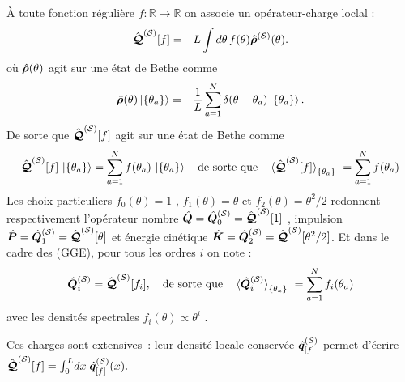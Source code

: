 
À toute fonction régulière
\(
  f:\mathbb R\!\to\!\mathbb R
\)
on associe un opérateur-charge loclal :
\begin{eqnarray}\label{chap.2.charge.f.1}
	\hat{\bm{\mathcal{Q}}}^{(\mathcal{S})}[f] & = &  L \int d\theta \, f(\theta) \hat{\bm{\rho}}^{(\mathcal{S})}(\theta).	
\end{eqnarray}
où $\hat{\bm{\rho}}(\theta)$ agit sur une état de Bethe comme 
\begin{eqnarray}\label{chap.2.rho.1}
	 \hat{\bm{\rho}}(\theta) \ket{ \{ \theta_a \} } &=& \frac{1}{L} \sum_{a = 1 }^N  \delta ( \theta - \theta_a ) \ket{ \{ \theta_a \} }.	
\end{eqnarray}
De sorte que $\hat{\bm{\mathcal{Q}}}^{(\mathcal{S})}[f]$ agit sur une état de Bethe comme
\begin{eqnarray}\label{chap.2.charge.1}
	\operator{\mathcal{Q}}^{(\mathcal{S})}[f]\,\ket{\{\theta_a\} } =  \sum_{a=1}^{N}f(\theta_a)\,\ket{\{\theta_a\} } \quad \mbox{de sorte que} \quad \braket{\operator{\mathcal{Q}}^{(\mathcal{S})}[f]}_{\{\theta_a\}} = \sum_{a=1}^N f(\theta_a)
\end{eqnarray}
Les choix particuliers
\(
  f_0(\theta)=1
\)
,
\(
  f_1(\theta)=\theta
\)
et
\(
  f_2(\theta)=\theta^{2}/2
\)
redonnent respectivement l'opérateur nombre \(\hat{\bm{Q}}=\hat{\bm{Q}}_0^{(\mathcal{S})} = \hat{\bm{\mathcal{Q}}}^{(\mathcal{S})}[1]\) , impulsion \(\hat{\bm{P}}=\hat{\bm{Q}}_1^{(\mathcal{S})} = \hat{\bm{\mathcal{Q}}}^{(\mathcal{S})}[\theta]\) et énergie cinétique
\(\hat{\bm{K}}=\hat{\bm{Q}}_2^{(\mathcal{S})} = \hat{\bm{\mathcal{Q}}}^{(\mathcal{S})}[\theta^2/2]\). Et dans le cadre des (GGE), pour tous les ordres $i$ on note :
\begin{eqnarray}\label{chap.2.charge.ordre.i.1}
	\operator{Q}^{(\mathcal{S})}_i = \operator{\mathcal{Q}}^{(\mathcal{S})}[f_i]	, \quad \mbox{de sorte que} \quad \braket{\operator{Q}^{(\mathcal{S})}_i}_{\{\theta_a\}} = \sum_{a=1}^N f_i(\theta_a)  
\end{eqnarray}
avec les densités spectrales $f_i(\theta) \propto \theta^i$ . 

Ces charges sont extensives : leur densité locale conservée $\hat{\bm{q}}^{(\mathcal{S})}_{[f]}$ permet d’écrire
\(
  \hat{\bm{\mathcal{Q}}}^{(\mathcal{S})}[f]=\int_0^{L}\!dx\;\hat{\bm{q}}^{(\mathcal{S})}_{[f]}(x).
\)

